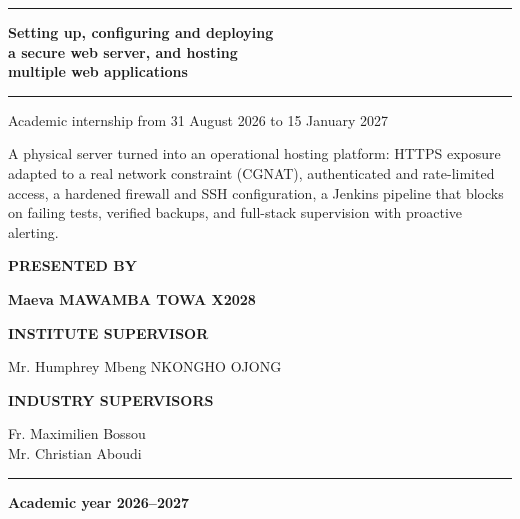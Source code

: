 \begin{titlepage}
\vspace{0.6cm}

{\color{ucacred}\rule{0.8\textwidth}{1.2pt}\par}
\vspace{0.3cm}
{\bfseries\fontsize{18}{24}\selectfont Setting up, configuring and deploying\\
a secure web server, and hosting\\
multiple web applications\par}
\vspace{0.3cm}
{\color{ucacred}\rule{0.8\textwidth}{1.2pt}\par}

\vspace{0.4cm}
{\large Academic internship from 31 August 2026 to 15 January 2027\par}

\vspace{0.8cm}
\begin{minipage}{0.82\textwidth}
  \small\centering
  A physical server turned into an operational hosting platform: HTTPS
  exposure adapted to a real network constraint (CGNAT), authenticated
  and rate-limited access, a hardened firewall and SSH configuration,
  a Jenkins pipeline that blocks on failing tests, verified backups,
  and full-stack supervision with proactive alerting.
\end{minipage}

\vfill

{\color{ucacred}\bfseries\small PRESENTED BY\par}
\vspace{0.2cm}
{\large\bfseries Maeva MAWAMBA TOWA X2028\par}

\vfill

\noindent
\begin{minipage}[t]{0.48\textwidth}
\centering
{\color{ucacred}\bfseries\small INSTITUTE SUPERVISOR\par}
\vspace{0.15cm}
Mr. Humphrey Mbeng NKONGHO OJONG
\end{minipage}\hfill
\begin{minipage}[t]{0.48\textwidth}
\centering
{\color{ucacred}\bfseries\small INDUSTRY SUPERVISORS\par}
\vspace{0.15cm}
Fr. Maximilien Bossou\\
Mr. Christian Aboudi
\end{minipage}

\vfill

{\color{ucacred}\rule{0.9\textwidth}{0.5pt}\par}
\vspace{0.3cm}
{\large\bfseries Academic year 2026--2027\par}
\vspace{0.6cm}
\end{titlepage}
